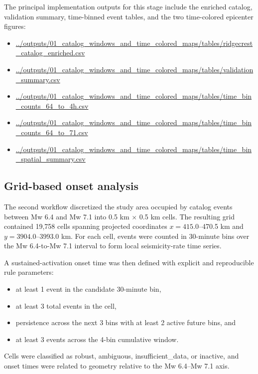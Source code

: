 \documentclass[11pt]{article}
\begin{document}
The principal implementation outputs for this stage include the enriched catalog, validation summary, time-binned event tables, and the two time-colored epicenter figures:
\begin{itemize}[leftmargin=1.5em]
    \item \url{../outputs/01_catalog_windows_and_time_colored_maps/tables/ridgecrest_catalog_enriched.csv}
    \item \url{../outputs/01_catalog_windows_and_time_colored_maps/tables/validation_summary.csv}
    \item \url{../outputs/01_catalog_windows_and_time_colored_maps/tables/time_bin_counts_64_to_4h.csv}
    \item \url{../outputs/01_catalog_windows_and_time_colored_maps/tables/time_bin_counts_64_to_71.csv}
    \item \url{../outputs/01_catalog_windows_and_time_colored_maps/tables/time_bin_spatial_summary.csv}
\end{itemize}

\subsection{Grid-based onset analysis}
The second workflow discretized the study area occupied by catalog events between Mw 6.4 and Mw 7.1 into 0.5 km $\times$ 0.5 km cells. The resulting grid contained 19,758 cells spanning projected coordinates $x=415.0$--470.5 km and $y=3904.0$--3993.0 km. For each cell, events were counted in 30-minute bins over the Mw 6.4-to-Mw 7.1 interval to form local seismicity-rate time series.

A sustained-activation onset time was then defined with explicit and reproducible rule parameters:
\begin{itemize}[leftmargin=1.5em]
    \item at least 1 event in the candidate 30-minute bin,
    \item at least 3 total events in the cell,
    \item persistence across the next 3 bins with at least 2 active future bins, and
    \item at least 3 events across the 4-bin cumulative window.
\end{itemize}
Cells were classified as robust, ambiguous, insufficient\_data, or inactive, and onset times were related to geometry relative to the Mw 6.4--Mw 7.1 axis.
\end{document}
